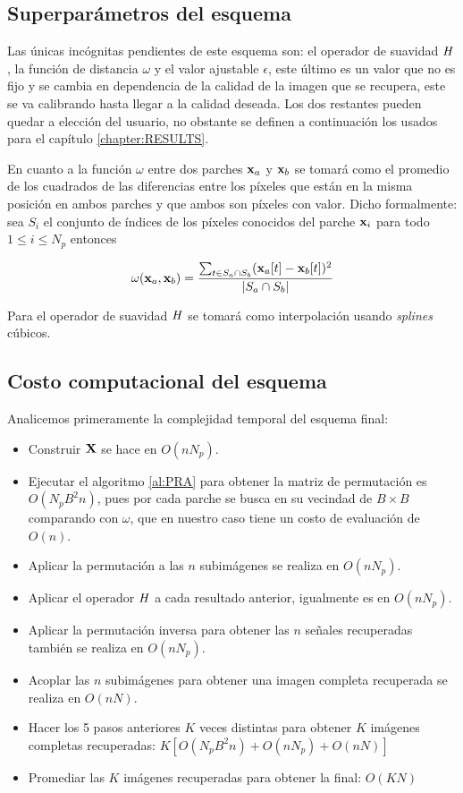 \subsection{Superpar\'ametros del esquema}
Las \'unicas incógnitas pendientes de este esquema son: el operador de suavidad $\mathit{H}$, la funci\'on de distancia $\omega$ y el valor ajustable $\epsilon$, este \'ultimo es un valor que no es fijo y se cambia en dependencia de la calidad de la imagen que se recupera, este se va calibrando hasta llegar a la calidad deseada. Los dos restantes pueden quedar a elecci\'on del usuario, no obstante se definen a continuaci\'on los usados para el cap\'itulo \ref{chapter:RESULTS}.

En cuanto a la funci\'on $\omega$ entre dos parches $\mathbf{x}_a$ y $\mathbf{x}_b$ se tomar\'a como el promedio de los cuadrados de las diferencias entre los p\'ixeles que est\'an en la misma posici\'on en ambos parches y que ambos son p\'ixeles con valor. Dicho formalmente: sea $S_i$ el conjunto de \'indices de los p\'ixeles conocidos del parche $\mathbf{x}_i$ para todo $1 \le i \le N_p$ entonces

\begin{equation}
\omega(\mathbf{x}_a, \mathbf{x}_b) = \frac{\sum_{t \in S_a \cap S_b} (\mathbf{x}_a[t] - \mathbf{x}_b[t])^2}{|S_a \cap S_b|}
\end{equation}

Para el operador de suavidad $\mathit{H}$ se tomar\'a como interpolaci\'on usando \textit{splines} c\'ubicos.

\subsection{Costo computacional del esquema}

Analicemos primeramente la complejidad temporal del esquema final:

\begin{itemize}
	\item Construir $\mathbf{X}$ se hace en $O(nN_p)$.
	\item Ejecutar el algoritmo \ref{al:PRA} para obtener la matriz de permutaci\'on es $O(N_pB^2n)$, pues por cada parche se busca en su vecindad de $B \times B$ comparando con $\omega$, que en nuestro caso tiene un costo de evaluaci\'on de $O(n)$.
	\item Aplicar la permutaci\'on a las $n$ subim\'agenes se realiza en $O(nN_p)$.
	\item Aplicar el operador $\mathit{H}$ a cada resultado anterior, igualmente es en $O(nN_p)$.
	\item Aplicar la permutaci\'on inversa para obtener las $n$ señales recuperadas también se realiza en $O(nN_p)$.
	\item Acoplar las $n$ subim\'agenes para obtener una imagen completa recuperada se realiza en $O(nN)$.
	\item Hacer los 5 pasos anteriores $K$ veces distintas para obtener $K$ im\'agenes completas recuperadas: $K[O(N_pB^2n) + O(nN_p) + O(nN)]$
	\item Promediar las $K$ im\'agenes recuperadas para obtener la final: $O(KN)$
\end{itemize}

